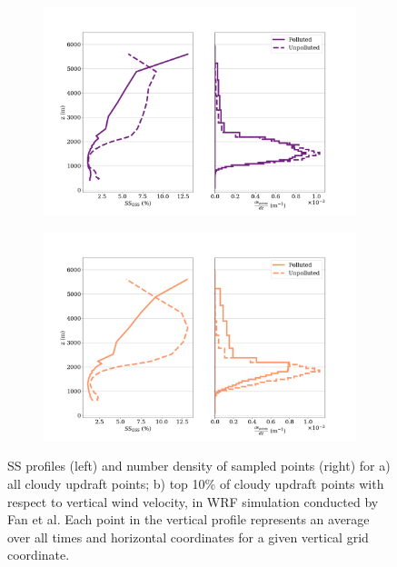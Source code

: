 \documentclass{article}
\begin{document}
\begin{figure}[ht]
	\centering
	\begin{subfigure}{0.7\textwidth}
		\includegraphics[width=\textwidth]{revmywrf/v5_FINAL_bipanel_ss_qss_vs_z_allpts_figure.png}
		\caption{}
		\label{wrfbipanelallpts}
	\end{subfigure}
	\begin{subfigure}{0.7\textwidth}
		\includegraphics[width=\textwidth]{revmywrf/v5_FINAL_bipanel_ss_qss_vs_z_up10perc_figure.png}
		\caption{}
		\label{wrfbipanelup50perc}
	\end{subfigure}
	\caption{SS profiles (left) and number density of sampled points (right) for a) all cloudy updraft points; b) top 10\% of cloudy updraft points with respect to vertical wind velocity, in WRF simulation conducted by Fan et al. Each point in the vertical profile represents an average over all times and horizontal coordinates for a given vertical grid coordinate.}
	\label{wrfbipanel}
\end{figure}
\end{document}
